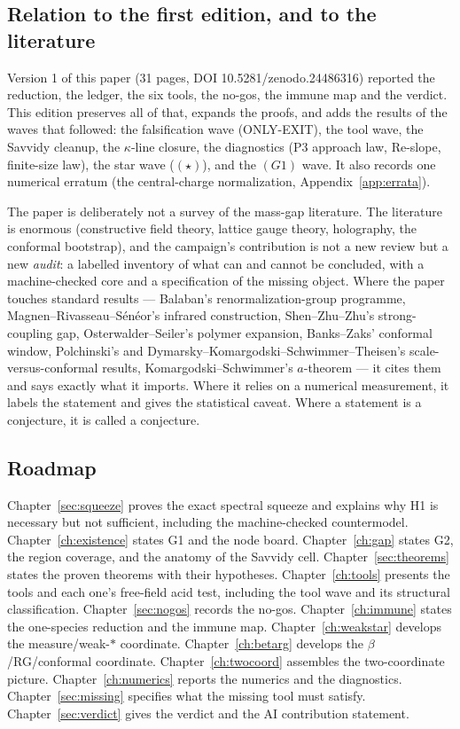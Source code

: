 \subsection{Relation to the first edition, and to the literature}

Version 1 of this paper (31 pages, DOI 10.5281/zenodo.24486316) reported the reduction, the
ledger, the six tools, the no-gos, the immune map and the verdict. This edition preserves all of
that, expands the proofs, and adds the results of the waves that followed: the falsification wave
(ONLY-EXIT), the tool wave, the Savvidy cleanup, the $\kappa$-line closure, the diagnostics
(P3 approach law, Re-slope, finite-size law), the star wave ($(\star)$), and the $(G1)$ wave. It
also records one numerical erratum (the central-charge normalization, Appendix~\ref{app:errata}).

The paper is deliberately not a survey of the mass-gap literature. The literature is enormous
(constructive field theory, lattice gauge theory, holography, the conformal bootstrap), and the
campaign's contribution is not a new review but a new \emph{audit}: a labelled inventory of what
can and cannot be concluded, with a machine-checked core and a specification of the missing
object. Where the paper touches standard results --- Balaban's renormalization-group programme,
Magnen--Rivasseau--S\'en\'eor's infrared construction, Shen--Zhu--Zhu's strong-coupling gap,
Osterwalder--Seiler's polymer expansion, Banks--Zaks' conformal window, Polchinski's and
Dymarsky--Komargodski--Schwimmer--Theisen's scale-versus-conformal results,
Komargodski--Schwimmer's $a$-theorem --- it cites them and says exactly what it imports.
Where it relies on a numerical measurement, it labels the statement \LE{} and gives the
statistical caveat. Where a statement is a conjecture, it is called a conjecture.

\subsection{Roadmap}

Chapter~\ref{sec:squeeze} proves the exact spectral squeeze and explains why H1 is necessary but
not sufficient, including the machine-checked countermodel. Chapter~\ref{ch:existence} states G1
and the node board. Chapter~\ref{ch:gap} states G2, the region coverage, and the anatomy of the
Savvidy cell. Chapter~\ref{sec:theorems} states the proven theorems with their hypotheses.
Chapter~\ref{ch:tools} presents the tools and each one's free-field acid test, including the tool
wave and its structural classification. Chapter~\ref{sec:nogos} records the no-gos.
Chapter~\ref{ch:immune} states the one-species reduction and the immune map.
Chapter~\ref{ch:weakstar} develops the measure/weak-$*$ coordinate.
Chapter~\ref{ch:betarg} develops the $\beta$/RG/conformal coordinate.
Chapter~\ref{ch:twocoord} assembles the two-coordinate picture.
Chapter~\ref{ch:numerics} reports the numerics and the diagnostics.
Chapter~\ref{sec:missing} specifies what the missing tool must satisfy.
Chapter~\ref{sec:verdict} gives the verdict and the AI contribution statement.

